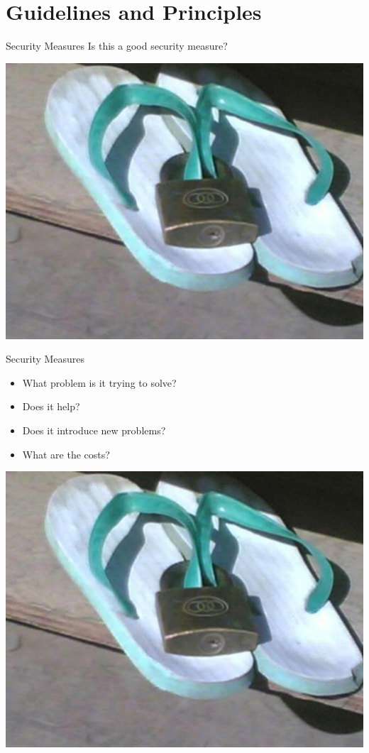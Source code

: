 \documentclass{beamer}
\begin{document}
\section{Guidelines and Principles}
\frame{\sectionpage}

\begin{frame}{Security Measures}
Is this a good security measure?
\begin{center}
\includegraphics[width=0.6\linewidth]{flipflops.png}
\end{center}
\end{frame}

\begin{frame}{Security Measures}
\begin{itemize}
 \item What problem is it trying to solve? 
 \item Does it help? 
 \item Does it introduce new problems? 
 \item What are the costs?
 \end{itemize} 
 \begin{center}
	\includegraphics[width=0.4\linewidth]{flipflops.png} 
 \end{center}
\end{frame}
\end{document}
